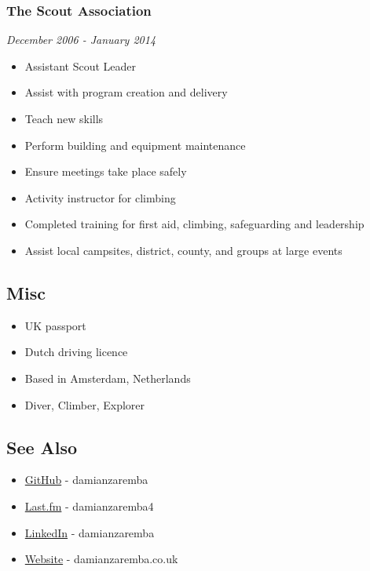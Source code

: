 \subsubsection{The Scout Association}\label{the-scout-association}

\emph{December 2006 - January 2014}

\begin{itemize}
\tightlist
\item
  Assistant Scout Leader
\item
  Assist with program creation and delivery
\item
  Teach new skills
\item
  Perform building and equipment maintenance
\item
  Ensure meetings take place safely
\item
  Activity instructor for climbing
\item
  Completed training for first aid, climbing, safeguarding and
  leadership
\item
  Assist local campsites, district, county, and groups at large events
\end{itemize}

\subsection{Misc}\label{misc}

\begin{itemize}
\tightlist
\item
  UK passport
\item
  Dutch driving licence
\item
  Based in Amsterdam, Netherlands
\item
  Diver, Climber, Explorer
\end{itemize}

\subsection{See Also}\label{see-also}

\begin{itemize}
\tightlist
\item
  \href{https://github.com/damianzaremba}{GitHub} - damianzaremba
\item
  \href{http://last.fm/user/damianzaremba4}{Last.fm} - damianzaremba4
\item
  \href{http://uk.linkedin.com/in/damianzaremba}{LinkedIn} -
  damianzaremba
\item
  \href{http://damianzaremba.co.uk}{Website} - damianzaremba.co.uk
\end{itemize}
